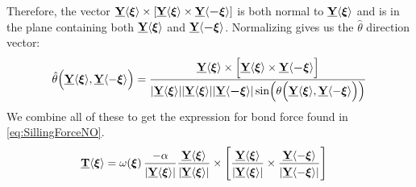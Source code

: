 \documentclass[preprint,review,12pt]{elsarticle}
\newcommand\vstate[3]{%
	\mathbf{\underline{#1}}%
	\ifstrempty{#2}{}{[#2]}%
	\ifstrempty{#3}{}{\langle #3 \rangle}}
\newcommand\tvstate[3]{%
	\mathbf{\underline{#1}\vphantom{\hat{\underline{#1}}}}%
	\ifstrempty{#2}{}{[#2]}%
	\ifstrempty{#3}{}{\langle #3 \rangle}}
\begin{document}
Therefore, the vector $\vstate{Y}{}{\boldsymbol{\xi}}\times\left[\vstate{Y}{}{\boldsymbol{\xi}}\times\vstate{Y}{}{\boldsymbol{-\xi}}\right]$ is both normal to $\vstate{Y}{}{\boldsymbol{\xi}}$ and is in the plane containing both $\vstate{Y}{}{\boldsymbol{\xi}}$ and $\vstate{Y}{}{\boldsymbol{-\xi}}$.
Normalizing gives us the $\hat{\theta}$ direction vector:
%
\begin{equation}
\hat{\theta}\!\left(\tvstate{Y}{}{\boldsymbol{\xi}},\tvstate{Y}{}{-\boldsymbol{\xi}}\right)=
\frac{\tvstate{Y}{}{\boldsymbol{\xi}}\times\left[\tvstate{Y}{}{\boldsymbol{\xi}}\times\tvstate{Y}{}{\boldsymbol{-\xi}}\right]}{|\tvstate{Y}{}{\boldsymbol{\xi}}||\tvstate{Y}{}{\boldsymbol{\xi}}||\tvstate{Y}{}{\boldsymbol{-\xi}}|\sin\!\left(\theta\!\left(\tvstate{Y}{}{\boldsymbol{\xi}},\tvstate{Y}{}{-\boldsymbol{\xi}}\right)\right)}\notag 
\end{equation}
%
We combine all of these to get the expression for bond force found in \cref{eq:SillingForceNO}.
\begin{align}
%
\tvstate{T}{}{\boldsymbol{\xi}} &=
\omega\!\left(\boldsymbol{\xi}\right)\frac{-\alpha}{|\tvstate{Y}{}{\boldsymbol{\xi}}|} \frac{\tvstate{Y}{}{\boldsymbol{\xi}}}{|\tvstate{Y}{}{\boldsymbol{\xi}}|} \times 
\left[\frac{\tvstate{Y}{}{\boldsymbol{\xi}}}{|\tvstate{Y}{}{\boldsymbol{\xi}}|} \times 
\frac{\tvstate{Y}{}{-\boldsymbol{\xi}}}{|\tvstate{Y}{}{-\boldsymbol{\xi}}|}\right]\notag
\end{align}
%
\end{document}
